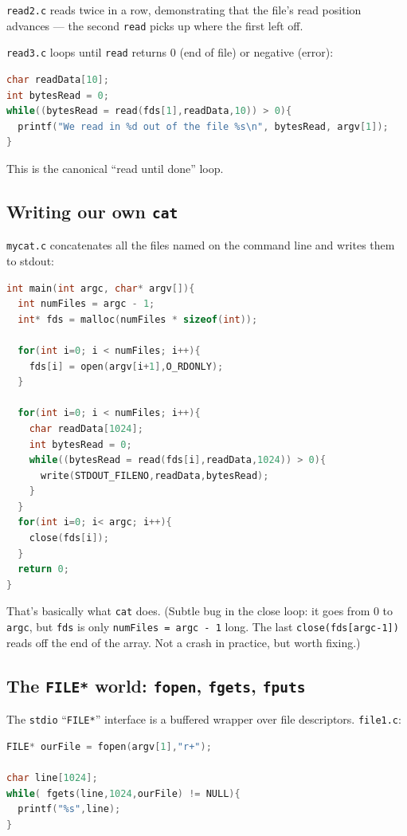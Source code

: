 \documentclass[11pt]{article}
\begin{document}
\texttt{read2.c} reads twice in a row, demonstrating that the
file's read position advances --- the second \texttt{read} picks
up where the first left off.

\texttt{read3.c} loops until \texttt{read} returns 0 (end of file)
or negative (error):

\begin{lstlisting}[language=C]
char readData[10];
int bytesRead = 0;
while((bytesRead = read(fds[1],readData,10)) > 0){
  printf("We read in %d out of the file %s\n", bytesRead, argv[1]);
}
\end{lstlisting}

This is the canonical ``read until done'' loop.

\subsection*{Writing our own \texttt{cat}}

\texttt{mycat.c} concatenates all the files named on the command
line and writes them to stdout:

\begin{lstlisting}[language=C]
int main(int argc, char* argv[]){
  int numFiles = argc - 1;
  int* fds = malloc(numFiles * sizeof(int));

  for(int i=0; i < numFiles; i++){
    fds[i] = open(argv[i+1],O_RDONLY);
  }

  for(int i=0; i < numFiles; i++){
    char readData[1024];
    int bytesRead = 0;
    while((bytesRead = read(fds[i],readData,1024)) > 0){
      write(STDOUT_FILENO,readData,bytesRead);
    }
  }
  for(int i=0; i< argc; i++){
    close(fds[i]);
  }
  return 0;
}
\end{lstlisting}

That's basically what \texttt{cat} does. (Subtle bug in the close
loop: it goes from 0 to \texttt{argc}, but \texttt{fds} is only
\texttt{numFiles = argc - 1} long. The last \texttt{close(fds[argc-1])}
reads off the end of the array. Not a crash in practice, but worth
fixing.)

\subsection*{The \texttt{FILE*} world: \texttt{fopen}, \texttt{fgets}, \texttt{fputs}}

The \texttt{stdio} ``\texttt{FILE*}'' interface is a buffered
wrapper over file descriptors. \texttt{file1.c}:

\begin{lstlisting}[language=C]
FILE* ourFile = fopen(argv[1],"r+");

char line[1024];
while( fgets(line,1024,ourFile) != NULL){
  printf("%s",line);
}
\end{lstlisting}
\end{document}
